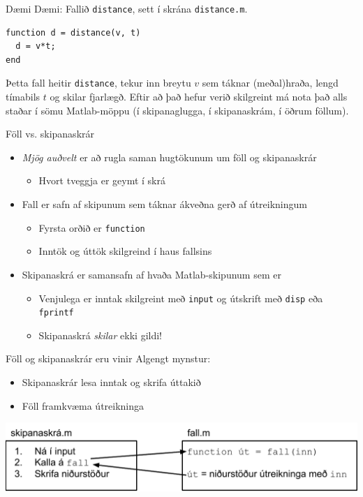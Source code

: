 \documentclass{beamer}
\begin{document}
\begin{frame}[fragile]{Dæmi}
Dæmi: Fallið \texttt{distance}, sett í skrána \texttt{distance.m}.
\begin{verbatim}
function d = distance(v, t)
  d = v*t;
end  
\end{verbatim}
Þetta fall heitir \texttt{distance}, tekur inn breytu $v$ sem táknar (meðal)hraða, lengd tímabils $t$ og skilar fjarlægð. Eftir að það hefur verið skilgreint má nota það alls staðar í sömu Matlab-möppu (í skipanaglugga, í skipanaskrám, í öðrum föllum).
\end{frame}

\begin{frame}{Föll vs. skipanaskrár}
\begin{itemize}
 \item \emph{Mjög auðvelt} er að rugla saman hugtökunum um föll og skipanaskrár
 \begin{itemize}
  \item Hvort tveggja er geymt í skrá
 \end{itemize}
 \item Fall er safn af skipunum sem táknar ákveðna gerð af útreikningum
 \begin{itemize}
  \item Fyrsta orðið er \texttt{function}
  \item Inntök og úttök skilgreind í haus fallsins
 \end{itemize}
 \item Skipanaskrá er samansafn af hvaða Matlab-skipunum sem er
 \begin{itemize}
  \item Venjulega er inntak skilgreint með \texttt{input} og útskrift með \texttt{disp} eða \texttt{fprintf}
  \item Skipanaskrá \emph{skilar} ekki gildi!
 \end{itemize}
\end{itemize}
\end{frame}

\begin{frame}{Föll og skipanaskrár eru vinir}
Algengt mynstur:
\begin{itemize}
 \item Skipanaskrár lesa inntak og skrifa úttakið
 \item Föll framkvæma útreikninga
\end{itemize}

\includegraphics[width=\textwidth]{Pics/skripta-og-fall}
\end{frame}
\end{document}
